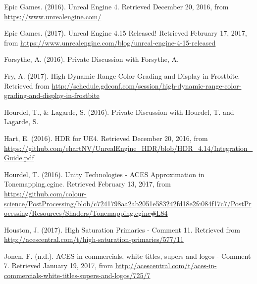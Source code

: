 \documentclass[conference]{IEEEtran}
\begin{document}
\begin{thebibliography}{1}
\renewcommand\@biblabel[1]{[Epi16]}
\bibitem{}
Epic Games. (2016). Unreal Engine 4. Retrieved December 20, 2016, from \url{https://www.unrealengine.com/} \vspace{2mm}

\renewcommand\@biblabel[1]{[Epi17]}
\bibitem{}
Epic Games. (2017). Unreal Engine 4.15 Released! Retrieved February 17, 2017, from \url{https://www.unrealengine.com/blog/unreal-engine-4-15-released} \vspace{2mm}

\renewcommand\@biblabel[1]{[For16]}
\bibitem{}
Forsythe, A. (2016). Private Discussion with Forsythe, A. \vspace{2mm}

\renewcommand\@biblabel[1]{[Fry17]}
\bibitem{}
Fry, A. (2017). High Dynamic Range Color Grading and Display in Frostbite. Retrieved from \url{http://schedule.gdconf.com/session/high-dynamic-range-color-grading-and-display-in-frostbite} \vspace{2mm}

\renewcommand\@biblabel[1]{[HL16]}
\bibitem{}
Hourdel, T., \& Lagarde, S. (2016). Private Discussion with Hourdel, T. and Lagarde, S. \vspace{2mm}

\renewcommand\@biblabel[1]{[Har16]}
\bibitem{}
Hart, E. (2016). HDR for UE4. Retrieved December 20, 2016, from \url{https://github.com/ehartNV/UnrealEngine_HDR/blob/HDR_4.14/Integration_Guide.pdf} \vspace{2mm}

\renewcommand\@biblabel[1]{[Hou16]}
\bibitem{}
Hourdel, T. (2016). Unity Technologies - ACES Approximation in Tonemapping.cginc. Retrieved February 13, 2017, from \url{https://github.com/colour-science/PostProcessing/blob/c7241798aa2ab2051e583242fd18e2fc084f17c7/PostProcessing/Resources/Shaders/Tonemapping.cginc#L84} \vspace{2mm}

\renewcommand\@biblabel[1]{[Hou17]}
\bibitem{}
Houston, J. (2017). High Saturation Primaries - Comment 11. Retrieved from \url{http://acescentral.com/t/high-saturation-primaries/577/11} \vspace{2mm}

\renewcommand\@biblabel[1]{[Jon17]}
\bibitem{}
Jonen, F. (n.d.). ACES in commercials, white titles, supers and logos - Comment 7. Retrieved January 19, 2017, from \url{http://acescentral.com/t/aces-in-commercials-white-titles-supers-and-logos/725/7} \vspace{2mm}


\end{thebibliography}
\end{document}
